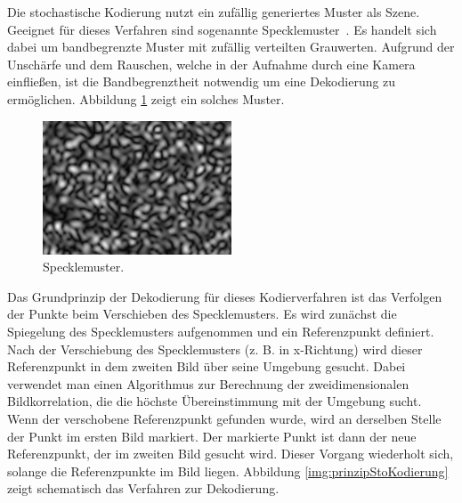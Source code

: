 Die stochastische Kodierung nutzt ein zufällig generiertes Muster als Szene.
Geeignet für dieses Verfahren sind sogenannte \glqq Specklemuster\grqq ~\cite{specklePattern}.
Es handelt sich dabei um bandbegrenzte Muster mit zufällig verteilten Grauwerten.
Aufgrund der Unschärfe und dem Rauschen, welche in der Aufnahme durch eine Kamera einfließen, ist die Bandbegrenztheit notwendig um eine Dekodierung zu ermöglichen.
Abbildung \ref{img:speckleMuster} zeigt ein solches Muster.
%
\begin{figure}[H]
	\centering
	\includegraphics[frame,width=0.5\textwidth]{02_grundlagenDerDeflektometrie/rekonstruktion/stochastischeKodierung/figures/speckleMuster}
	\caption[Specklemuster]{Specklemuster.}
	\label{img:speckleMuster}
\end{figure}
%
\noindent
Das Grundprinzip der Dekodierung für dieses Kodierverfahren ist das Verfolgen der Punkte beim Verschieben des Specklemusters.
Es wird zunächst die Spiegelung des Specklemusters aufgenommen und ein Referenzpunkt definiert.
Nach der Verschiebung des Specklemusters (z. B. in x-Richtung) wird dieser Referenzpunkt in dem zweiten Bild über seine Umgebung gesucht.
Dabei verwendet man einen Algorithmus zur Berechnung der zweidimensionalen Bildkorrelation, die die höchste Übereinstimmung mit der Umgebung sucht.
Wenn der verschobene Referenzpunkt gefunden wurde, wird an derselben Stelle der Punkt im ersten Bild markiert.
Der markierte Punkt ist dann der neue Referenzpunkt, der im zweiten Bild gesucht wird.
Dieser Vorgang wiederholt sich, solange die Referenzpunkte im Bild liegen.
Abbildung \ref{img:prinzipStoKodierung} zeigt schematisch das Verfahren zur Dekodierung.
%
